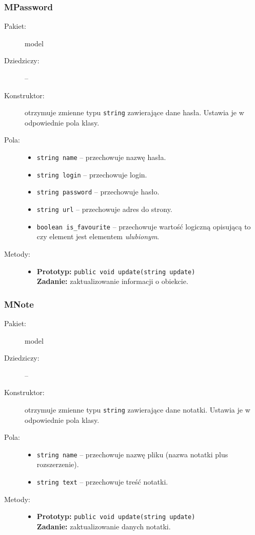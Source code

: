 \documentclass[a4paper]{article}
\newcommand{\prog}{\texttt}
\begin{document}
\subsubsection{MPassword}
\begin{description}
    \item[Pakiet:] model
    \item[Dziedziczy:] --
    \item[Konstruktor:] otrzymuje zmienne typu \prog{string} zawierające dane hasła. Ustawia je w odpowiednie pola klasy.
    \item[Pola:] \hfill
    \begin{itemize}
        \item \prog{string name} -- przechowuje nazwę hasła.
        \item \prog{string login} -- przechowuje login.
        \item \prog{string password} -- przechowuje hasło.
        \item \prog{string url} -- przechowuje adres do strony.
        \item \prog{boolean is\_favourite} -- przechowuje wartość logiczną opisującą to czy element jest elementem \textit{ulubionym}.
    \end{itemize}
    \item[Metody:] \hfill
    \begin{itemize}
      \item \textbf{Prototyp:} \prog{public void update(string update)}\\\textbf{Zadanie:} zaktualizowanie informacji o obiekcie.
    \end{itemize}
\end{description}

\subsubsection{MNote}
\begin{description}
    \item[Pakiet:] model
    \item[Dziedziczy:] --
    \item[Konstruktor:] otrzymuje zmienne typu \prog{string} zawierające dane notatki. Ustawia je w odpowiednie pola klasy.
    \item[Pola:] \hfill
    \begin{itemize}
        \item \prog{string name} -- przechowuje nazwę pliku (nazwa notatki plus rozszerzenie).
        \item \prog{string text} -- przechowuje treść notatki.
    \end{itemize}
    \item[Metody:] \hfill
    \begin{itemize}
        \item \textbf{Prototyp:} \prog{public void update(string update)}\\\textbf{Zadanie:} zaktualizowanie danych notatki.
    \end{itemize}
\end{description}
\end{document}
